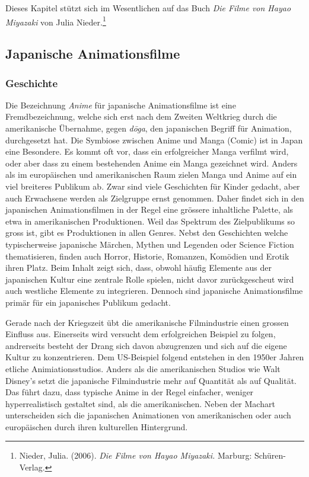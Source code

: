 Dieses Kapitel stützt sich im Wesentlichen auf das Buch \emph{Die Filme von Hayao Miyazaki} von Julia Nieder.\footnote{Nieder, Julia. (2006). \emph{Die Filme von Hayao Miyazaki.}	Marburg: Schüren-Verlag.}

\subsection{Japanische Animationsfilme}
\subsubsection{Geschichte}
Die Bezeichnung \emph{Anime} für japanische Animationsfilme ist eine Fremdbezeichnung, welche sich erst nach dem Zweiten Weltkrieg durch die amerikanische Übernahme, gegen \emph{d\={o}ga}, den japanischen Begriff für Animation, durchgesetzt hat. Die Symbiose zwischen Anime und Manga (Comic) ist in Japan eine Besondere. Es kommt oft vor, dass ein erfolgreicher Manga verfilmt wird, oder aber dass zu einem bestehenden Anime ein Manga gezeichnet wird. 
Anders als im europäischen und amerikanischen Raum zielen Manga und Anime auf ein viel breiteres Publikum ab. Zwar sind viele Geschichten für Kinder gedacht, aber auch Erwachsene werden als Zielgruppe ernst genommen. Daher findet sich in den japanischen Animationsfilmen in der Regel eine grössere inhaltliche Palette, als etwa in amerikanischen Produktionen. Weil das Spektrum des Zielpublikums so gross ist, gibt es Produktionen in allen Genres. Nebst den Geschichten welche typischerweise japanische Märchen, Mythen und Legenden oder Science Fiction thematisieren, finden auch Horror, Historie, Romanzen, Komödien und Erotik ihren Platz. Beim Inhalt zeigt sich, dass, obwohl häufig Elemente aus der japanischen Kultur eine zentrale Rolle spielen, nicht davor zurückgescheut wird auch westliche Elemente zu integrieren. Dennoch sind japanische Animationsfilme primär für ein japanisches Publikum gedacht. 

Gerade nach der Kriegszeit übt die amerikanische Filmindustrie einen grossen Einfluss aus. Einerseits wird versucht dem erfolgreichen Beispiel zu folgen, andrerseits besteht der Drang sich davon abzugrenzen und sich auf die eigene Kultur zu konzentrieren. Dem US-Beispiel folgend entstehen in den 1950er Jahren etliche Animiationsstudios. Anders als die amerikanischen Studios wie Walt Disney's setzt die japanische Filmindustrie mehr auf Quantität als auf Qualität. Das führt dazu, dass typische Anime in der Regel einfacher, weniger hyperrealistisch gestaltet sind, als die amerikanischen. Neben der Machart unterscheiden sich die japanischen Animationen von amerikanischen oder auch europäischen durch ihren kulturellen Hintergrund. 

